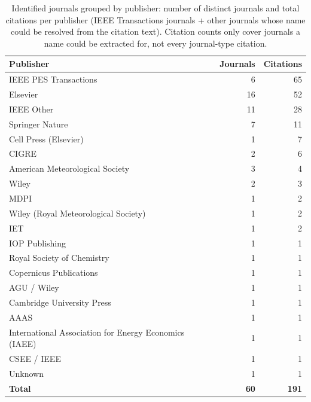 \begin{table}[htbp]
\centering
\small
\begin{tabular}{lrr}
\toprule
Publisher & Journals & Citations \\
\midrule
    IEEE PES Transactions & 6 & 65 \\
    Elsevier & 16 & 52 \\
    IEEE Other & 11 & 28 \\
    Springer Nature & 7 & 11 \\
    Cell Press (Elsevier) & 1 & 7 \\
    CIGRE & 2 & 6 \\
    American Meteorological Society & 3 & 4 \\
    Wiley & 2 & 3 \\
    MDPI & 1 & 2 \\
    Wiley (Royal Meteorological Society) & 1 & 2 \\
    IET & 1 & 2 \\
    IOP Publishing & 1 & 1 \\
    Royal Society of Chemistry & 1 & 1 \\
    Copernicus Publications & 1 & 1 \\
    AGU / Wiley & 1 & 1 \\
    Cambridge University Press & 1 & 1 \\
    AAAS & 1 & 1 \\
    International Association for Energy Economics (IAEE) & 1 & 1 \\
    CSEE / IEEE & 1 & 1 \\
    Unknown & 1 & 1 \\
\midrule
    \textbf{Total} & \textbf{60} & \textbf{191} \\
\bottomrule
\end{tabular}
\caption{Identified journals grouped by publisher: number of distinct journals and total citations per publisher (IEEE Transactions journals + other journals whose name could be resolved from the citation text). Citation counts only cover journals a name could be extracted for, not every journal-type citation.}
\label{tab:publisher_groups}
\end{table}

